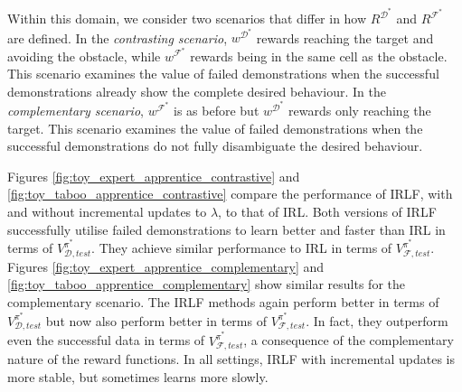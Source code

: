 \documentclass[letterpaper]{article}
\newcommand{\jm}[1]{\textcolor{blue}{Joao: #1}}
\newcommand{\ks}[1]{\textcolor{green}{Kyriacos: #1}}
\newcommand{\jm}[1]{}
\newcommand{\ks}[1]{}
\begin{document}

Within this domain, we consider two scenarios that differ in how $R^{\mathcal{D}^*}$ and $R^{\mathcal{F}^*}$ are defined.  In the \emph{contrasting scenario}, $w^{\mathcal{D}^*}$ rewards reaching the target and avoiding the obstacle, while $w^{\mathcal{F}^*}$ rewards being in the same cell as the obstacle.  This scenario examines the value of failed demonstrations when the successful demonstrations already show the complete desired behaviour.  In the \emph{complementary scenario}, $w^{\mathcal{F}^*}$ is as before but $w^{\mathcal{D}^*}$ rewards only reaching the target. This scenario examines the value of failed demonstrations when the successful demonstrations do not fully disambiguate the desired behaviour.


Figures \ref{fig:toy_expert_apprentice_contrastive} and \ref{fig:toy_taboo_apprentice_contrastive} compare the performance of IRLF, with and without incremental updates to $\lambda$, to that of IRL. Both versions of IRLF successfully utilise failed demonstrations to learn better and faster than IRL in terms of $V^{\pi^*}_{\mathcal{D},test}$.  They achieve similar performance to IRL in terms of $V^{\pi^*}_{\mathcal{F},test}$.  Figures \ref{fig:toy_expert_apprentice_complementary} and \ref{fig:toy_taboo_apprentice_complementary} show similar results for the complementary scenario.  The IRLF methods again perform better in terms of $V^{\pi^*}_{\mathcal{D},test}$ but now also perform better in terms of $V^{\pi^*}_{\mathcal{F},test}$.  In fact, they outperform even the successful data in terms of $V^{\pi^*}_{\mathcal{F},test}$, a consequence of the complementary nature of the reward functions.  In all settings, IRLF with incremental updates is more stable, but sometimes learns more slowly.
\end{document}
